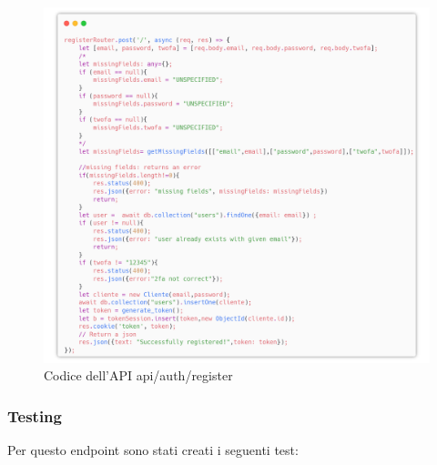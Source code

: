 \documentclass{report}
\begin{document}
\begin{figure}[H]
	\centering\includegraphics[width=1\textwidth]{images/microservizio-autenticazione/register-carbon.png}
	Codice dell'API api/auth/register
\end{figure}


\subsubsection*{Testing}
Per questo endpoint sono stati creati i seguenti test:
\end{document}
